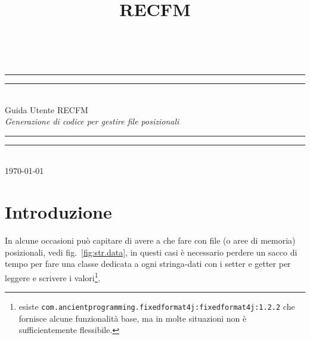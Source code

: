 \documentclass[a4paper,10pt]{report}
\title{RECFM}
\begin{document}
\begin{titlepage}
\newlength{\drop}%
\textheight
\centering
\settowidth{\unitlength}{\large\itshape Generazione di codice per gestire file posizionali}
\vspace*{\baselineskip}
\\[\baselineskip]
\rule{\unitlength}{1.6pt}\vspace*{-\baselineskip}\vspace*{2pt}
\rule{\unitlength}{0.4pt}\\[\baselineskip]
{\Huge Guida Utente RECFM}\\[\baselineskip]
{\large\itshape Generazione di codice per gestire file posizionali}\\[0.2\baselineskip]
\rule{\unitlength}{0.4pt}\vspace*{-\baselineskip}\vspace{3.2pt}
\rule{\unitlength}{1.6pt}\\[\baselineskip]
\vfill
{\small\scshape \today}\par
\vspace*{\drop}
\end{titlepage}


\section*{Introduzione}
In alcune occasioni può capitare di avere a che fare con file (o aree di 
memoria) posizionali, vedi fig.~\ref{fig:str.data}, in questi casi è necessario 
perdere un sacco di tempo per fare una classe dedicata a ogni stringa-dati con 
i setter e getter per leggere e scrivere i valori\footnote{%
esiste \texttt{com.ancientprogramming.fixedformat4j:fixedformat4j:1.2.2} che 
fornisce alcune funzionalità base, ma in molte situazioni non è sufficientemente
flessibile.
}. 
\end{document}
